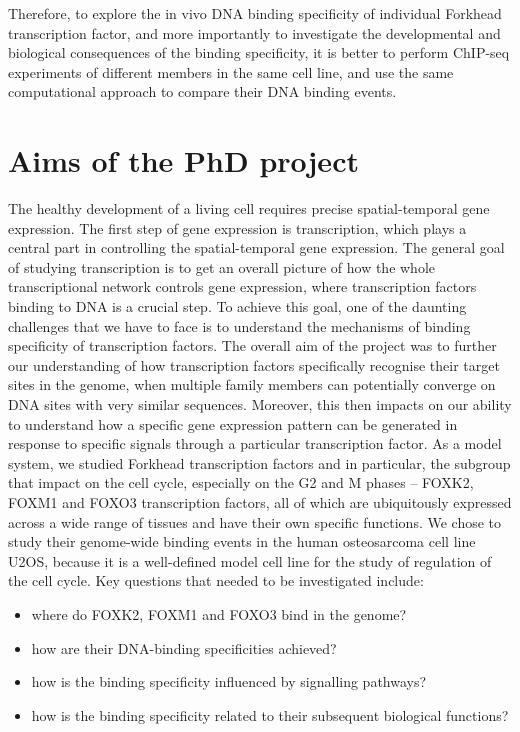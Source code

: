 Therefore, to explore the in vivo DNA binding specificity of individual Forkhead transcription factor, and more importantly to investigate the developmental and biological consequences of the binding specificity, it is better to perform ChIP-seq experiments of different members in the same cell line, and use the same computational approach to compare their DNA binding events.

\pagebreak

\section{Aims of the PhD project}

The healthy development of a living cell requires precise spatial-temporal gene expression. The first step of gene expression is transcription, which plays a central part in controlling the spatial-temporal gene expression. The general goal of studying transcription is to get an overall picture of how the whole transcriptional network controls gene expression, where transcription factors binding to DNA is a crucial step. To achieve this goal, one of the daunting challenges that we have to face is to understand the mechanisms of binding specificity of transcription factors. The overall aim of the project was to further our understanding of how transcription factors specifically recognise their target sites in the genome, when multiple family members can potentially converge on DNA sites with very similar sequences. Moreover, this then impacts on our ability to understand how a specific gene expression pattern can be generated in response to specific signals through a particular transcription factor. As a model system, we studied Forkhead transcription factors and in particular, the subgroup that impact on the cell cycle, especially on the G2 and M phases -- FOXK2, FOXM1 and FOXO3 transcription factors, all of which are ubiquitously expressed across a wide range of tissues and have their own specific functions. We chose to study their genome-wide binding events in the human osteosarcoma cell line U2OS, because it is a well-defined model cell line for the study of regulation of the cell cycle. Key questions that needed to be investigated include:

\begin{itemize}
    \item where do FOXK2, FOXM1 and FOXO3 bind in the genome?
    \item how are their DNA-binding specificities achieved?
    \item how is the binding specificity influenced by signalling pathways?
    \item how is the binding specificity related to their subsequent biological functions?
\end{itemize}